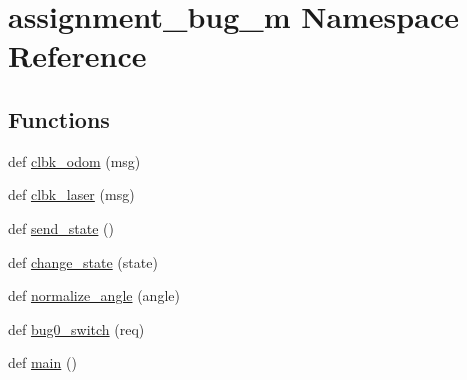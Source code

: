 \hypertarget{namespaceassignment__bug__m}{}\section{assignment\+\_\+bug\+\_\+m Namespace Reference}
\label{namespaceassignment__bug__m}
\subsection*{Functions}
\begin{DoxyCompactItemize}
\item 
def \hyperlink{namespaceassignment__bug__m_a29be5c4287b97f451ae70f28da8d44e7}{clbk\+\_\+odom} (msg)
\item 
def \hyperlink{namespaceassignment__bug__m_a3bba249d5aa299100d95a04b669ec678}{clbk\+\_\+laser} (msg)
\item 
def \hyperlink{namespaceassignment__bug__m_a60aea0f95c1f8227734d33b9d88c53ba}{send\+\_\+state} ()
\item 
def \hyperlink{namespaceassignment__bug__m_a36b72f9f3e85d1249a30af7fcb4047a4}{change\+\_\+state} (state)
\item 
def \hyperlink{namespaceassignment__bug__m_acdc531f4e1a9d7c370592a599fe91d32}{normalize\+\_\+angle} (angle)
\item 
def \hyperlink{namespaceassignment__bug__m_a68fc9be50b968f41b698d19482405fb2}{bug0\+\_\+switch} (req)
\item 
def \hyperlink{namespaceassignment__bug__m_ae5534780f8247d41cb25414aeb3772c2}{main} ()
\end{DoxyCompactItemize}
